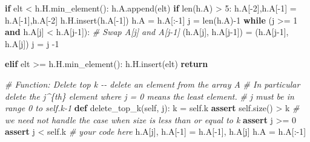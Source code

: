 \documentclass[
]{article}
\newenvironment{Shaded}{}{}
\newcommand{\BuiltInTok}[1]{\textcolor[rgb]{0.00,0.50,0.00}{#1}}
\newcommand{\CommentTok}[1]{\textcolor[rgb]{0.38,0.63,0.69}{\textit{#1}}}
\newcommand{\ControlFlowTok}[1]{\textcolor[rgb]{0.00,0.44,0.13}{\textbf{#1}}}
\newcommand{\DecValTok}[1]{\textcolor[rgb]{0.25,0.63,0.44}{#1}}
\newcommand{\KeywordTok}[1]{\textcolor[rgb]{0.00,0.44,0.13}{\textbf{#1}}}
\newcommand{\NormalTok}[1]{#1}
\newcommand{\OperatorTok}[1]{\textcolor[rgb]{0.40,0.40,0.40}{#1}}
\newcommand{\VariableTok}[1]{\textcolor[rgb]{0.10,0.09,0.49}{#1}}
\begin{document}
\begin{Shaded}
\begin{Highlighting}[]
        \ControlFlowTok{if}\NormalTok{ elt }\OperatorTok{\textless{}}\NormalTok{ h.H.min\_element():}
\NormalTok{          h.A.append(elt)}
          \ControlFlowTok{if} \BuiltInTok{len}\NormalTok{(h.A) }\OperatorTok{\textgreater{}} \DecValTok{5}\NormalTok{:}
\NormalTok{            h.A[}\OperatorTok{{-}}\DecValTok{2}\NormalTok{],h.A[}\OperatorTok{{-}}\DecValTok{1}\NormalTok{] }\OperatorTok{=}\NormalTok{ h.A[}\OperatorTok{{-}}\DecValTok{1}\NormalTok{],h.A[}\OperatorTok{{-}}\DecValTok{2}\NormalTok{]}
\NormalTok{            h.H.insert(h.A[}\OperatorTok{{-}}\DecValTok{1}\NormalTok{])}
\NormalTok{            h.A }\OperatorTok{=}\NormalTok{ h.A[:}\OperatorTok{{-}}\DecValTok{1}\NormalTok{]}
\NormalTok{            j }\OperatorTok{=} \BuiltInTok{len}\NormalTok{(h.A)}\OperatorTok{{-}}\DecValTok{1}
            \ControlFlowTok{while}\NormalTok{ (j }\OperatorTok{\textgreater{}=} \DecValTok{1} \KeywordTok{and}\NormalTok{ h.A[j] }\OperatorTok{\textless{}}\NormalTok{ h.A[j}\OperatorTok{{-}}\DecValTok{1}\NormalTok{]):}
                \CommentTok{\# Swap A[j] and A[j{-}1]}
\NormalTok{                (h.A[j], h.A[j}\OperatorTok{{-}}\DecValTok{1}\NormalTok{]) }\OperatorTok{=}\NormalTok{ (h.A[j}\OperatorTok{{-}}\DecValTok{1}\NormalTok{], h.A[j])}
\NormalTok{                j }\OperatorTok{=}\NormalTok{ j }\OperatorTok{{-}}\DecValTok{1}

        \ControlFlowTok{elif}\NormalTok{ elt }\OperatorTok{\textgreater{}=}\NormalTok{ h.H.min\_element():}
\NormalTok{          h.H.insert(elt)}
        \ControlFlowTok{return}



    \CommentTok{\# Function: Delete top k {-}{-} delete an element from the array A}
    \CommentTok{\# In particular delete the j\^{}\{th\} element where j = 0 means the least element.}
    \CommentTok{\# j must be in range 0 to self.k{-}1}
    \KeywordTok{def}\NormalTok{ delete\_top\_k(}\VariableTok{self}\NormalTok{, j):}
\NormalTok{        k }\OperatorTok{=} \VariableTok{self}\NormalTok{.k}
        \ControlFlowTok{assert} \VariableTok{self}\NormalTok{.size() }\OperatorTok{\textgreater{}}\NormalTok{ k }\CommentTok{\# we need not handle the case when size is less than or equal to k}
        \ControlFlowTok{assert}\NormalTok{ j }\OperatorTok{\textgreater{}=} \DecValTok{0}
        \ControlFlowTok{assert}\NormalTok{ j }\OperatorTok{\textless{}} \VariableTok{self}\NormalTok{.k}
        \CommentTok{\# your code here}
\NormalTok{        h.A[j], h.A[}\OperatorTok{{-}}\DecValTok{1}\NormalTok{] }\OperatorTok{=}\NormalTok{ h.A[}\OperatorTok{{-}}\DecValTok{1}\NormalTok{], h.A[j]}
\NormalTok{        h.A }\OperatorTok{=}\NormalTok{ h.A[:}\OperatorTok{{-}}\DecValTok{1}\NormalTok{]}


\end{Highlighting}
\end{Shaded}
\end{document}
